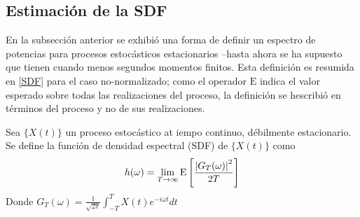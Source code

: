 
\subsection{Estimaci\'on de la SDF}

En la subsecci\'on anterior se exhibi\'o una forma de definir un espectro de potencias para 
procesos estoc\'asticos estacionarios --hasta ahora se ha supuesto que tienen cuando menos
segundos momentos finitos. Esta definici\'on es resumida en \ref{SDF} para el caso no-normalizado;
como el operador $\mathrm{E}$ indica el valor esperado sobre todas las realizaciones del proceso,
la definici\'on se hescribi\'o en t\'erminos del proceso y no de sus realizaciones.

\begin{defn}
Sea $\{X(t)\}$ un proceso estoc\'astico at iempo continuo, d\'ebilmente estacionario. Se define
la funci\'on de densidad espectral (SDF) de $\{X(t)\}$ como
\begin{equation*}
h(\omega) = \lim_{T\rightarrow \infty} \mathrm{E}\left[  \frac{ \left| G_T(\omega) \right|^{2}}{2 T}  \right]
\end{equation*}
Donde $G_T (\omega) = \frac{1}{\sqrt{2 \pi}} \int_{-T}^{T} X(t) e^{-i \omega t} dt$
\label{SDF}
\end{defn}



%

